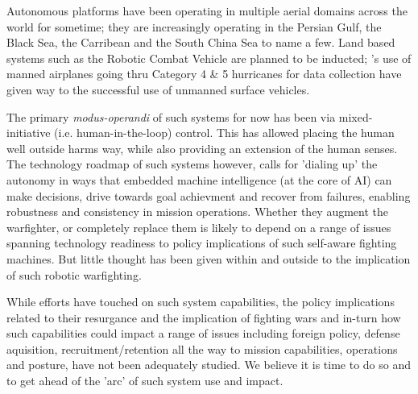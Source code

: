 \documentclass[11pt,letterpaper]{article}
\begin{document}
Autonomous platforms have been operating in multiple aerial domains
across the world for sometime; they are increasingly operating in the
Persian Gulf, the Black Sea, the Carribean and the South China Sea to
name a few. Land based systems such as the Robotic Combat Vehicle are
planned to be inducted; \noae's use of manned airplanes going thru
Category 4 \& 5 hurricanes for data collection have given way to the
successful use of unmanned surface vehicles.

The primary \emph{modus-operandi} of such systems for now has been via
mixed-initiative (i.e. human-in-the-loop) control. This has allowed
placing the human well outside harms way, while also providing an
extension of the human senses. The technology roadmap of such systems
however, calls for 'dialing up' the autonomy in ways that embedded
machine intelligence (at the core of AI) can make decisions, drive
towards goal achievment and recover from failures, enabling robustness
and consistency in mission operations. Whether they augment the
warfighter, or completely replace them is likely to depend on a range
of issues spanning technology readiness to policy implications of such
self-aware fighting machines. But little thought has been given within
and outside \org to the implication of such robotic warfighting. 

While \org efforts have touched on such system capabilities, the
policy implications related to their resurgance and the implication of
fighting wars and in-turn how such capabilities could impact a range
of issues including foreign policy, defense aquisition,
recruitment/retention all the way to mission capabilities, operations
and posture, have not been adequately studied. We believe it is time
to do so and to get ahead of the 'arc' of such system use and impact.
 
\end{document}
